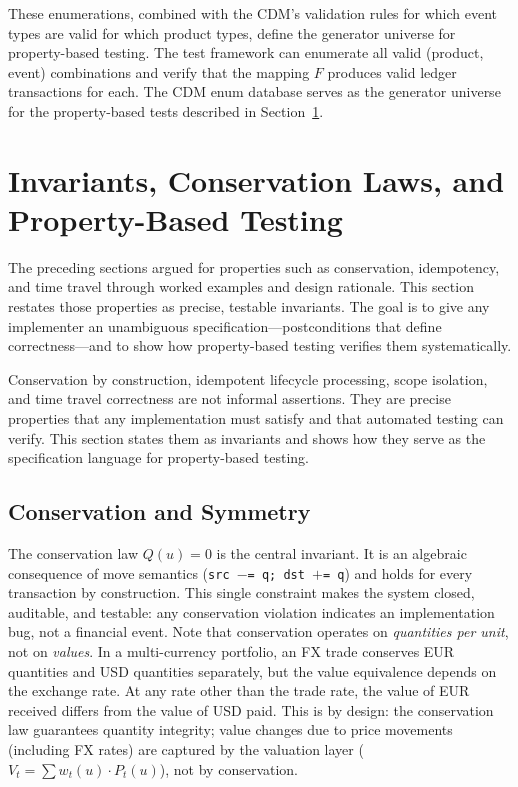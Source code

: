 \documentclass[11pt,a4paper]{article}
\begin{document}
These enumerations, combined with the CDM's validation rules for which event types are valid for which product types, define the generator universe for property-based testing. The test framework can enumerate all valid (product, event) combinations and verify that the mapping $F$ produces valid ledger transactions for each. The CDM enum database serves as the generator universe for the property-based tests described in Section~\ref{sec:invariants}.

\clearpage
\section{Invariants, Conservation Laws, and Property-Based Testing}
\label{sec:invariants}

The preceding sections argued for properties such as conservation, idempotency, and time travel through worked examples and design rationale. This section restates those properties as precise, testable invariants. The goal is to give any implementer an unambiguous specification---postconditions that define correctness---and to show how property-based testing verifies them systematically.

Conservation by construction, idempotent lifecycle processing, scope isolation, and time travel correctness are not informal assertions. They are precise properties that any implementation must satisfy and that automated testing can verify. This section states them as invariants and shows how they serve as the specification language for property-based testing.

\subsection{Conservation and Symmetry}

The conservation law $Q(u) = 0$ is the central invariant. It is an algebraic consequence of move semantics (\texttt{src $-$= q; dst $+$= q}) and holds for every transaction by construction. This single constraint makes the system closed, auditable, and testable: any conservation violation indicates an implementation bug, not a financial event. Note that conservation operates on \emph{quantities per unit}, not on \emph{values}. In a multi-currency portfolio, an FX trade conserves EUR quantities and USD quantities separately, but the value equivalence depends on the exchange rate. At any rate other than the trade rate, the value of EUR received differs from the value of USD paid. This is by design: the conservation law guarantees quantity integrity; value changes due to price movements (including FX rates) are captured by the valuation layer ($V_t = \sum w_t(u) \cdot P_t(u)$), not by conservation.
\end{document}
